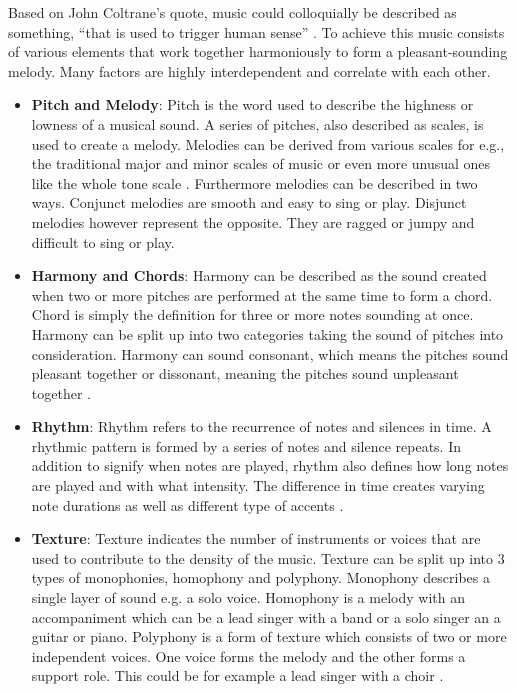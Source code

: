 Based on John Coltrane's quote, music could colloquially be described as something,
“that is used to trigger human sense” \cite{Havers2021Sax}.
To achieve this music consists of various elements that work together harmoniously to form
a pleasant-sounding melody.
Many factors are highly interdependent and correlate with each other. 
\begin{itemize}
    \item \textbf{Pitch and Melody}: Pitch is the word used to describe the highness or lowness of
    a musical sound.
    A series of pitches, also described as scales, is used to create a melody.
    Melodies can be derived from various scales for e.g., the traditional major and minor scales
    of music or even more unusual ones like the whole tone scale \cite[86]{Hemming2015}.
    Furthermore melodies can be described in two ways.
    Conjunct melodies are smooth and easy to sing or play.
    Disjunct melodies however represent the opposite.
    They are ragged or jumpy and difficult to sing or play.

    \item \textbf{Harmony and Chords}: Harmony can be described as the sound created when two or more
    pitches are performed at the same time to form a chord.
    Chord is simply the definition for three or more notes sounding at once.
    Harmony can be split up into two categories taking the sound of pitches into consideration.
    Harmony can sound consonant, which means the pitches sound pleasant together or dissonant,
    meaning the pitches sound unpleasant together \cite[94]{Hemming2015}.

    \item \textbf{Rhythm}: Rhythm refers to the recurrence of notes and silences in time.
    A rhythmic pattern is formed by a series of notes and silence repeats.
    In addition to signify when notes are played, rhythm also defines how long notes are played and
    with what intensity.
    The difference in time creates varying note durations as well as different type of accents \cite{MilneMusicFundamentals}.

    \item \textbf{Texture}: Texture indicates the number of instruments or voices that are used
    to contribute to the density of the music. Texture can be split up into 3 types of monophonies,
    homophony and polyphony.
    Monophony describes a single layer of sound e.g. a solo voice.
    Homophony is a melody with an accompaniment which can be a lead singer with a band or a solo
    singer an a guitar or piano.
    Polyphony is a form of texture which consists of two or more independent voices.
    One voice forms the melody and the other forms a support role.
    This could be for example a lead singer with a choir \cite{2019ShawMusic}. 


\end{itemize}
